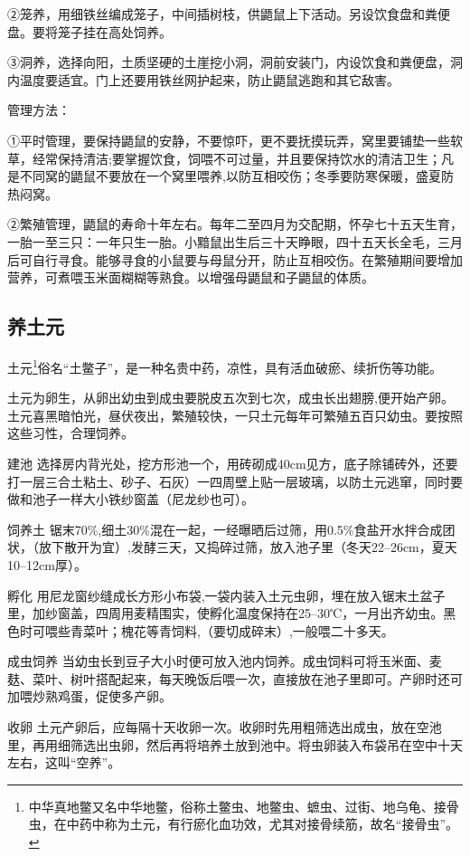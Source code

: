\documentclass{ctexbook}
\begin{document}
②笼养，用细铁丝编成笼子，中间插树枝，供鼯鼠上下活动。另设饮食盘和粪便盘。要将笼子挂在高处饲养。

③洞养，选择向阳，土质坚硬的土崖挖小洞，洞前安装门，内设饮食和粪便盘，洞内温度要适宜。门上还要用铁丝网护起来，防止鼯鼠逃跑和其它敌害。

管理方法：

①平时管理，要保持鼯鼠的安静，不要惊吓，更不要抚摸玩弄，窝里要铺垫一些软草，经常保持清洁;要掌握饮食，饲喂不可过量，并且要保持饮水的清洁卫生；凡是不同窝的鼯鼠不要放在一个窝里喂养,以防互相咬伤；冬季要防寒保暖，盛夏防热闷窝。

②繁殖管理，鼯鼠的寿命十年左右。每年二至四月为交配期，怀孕七十五天生育，一胎一至三只：一年只生一胎。小黯鼠出生后三十天睁眼，四十五天长全毛，三月后可自行寻食。能够寻食的小鼠要与母鼠分开，防止互相咬伤。在繁殖期间要增加营养，可煮喂玉米面糊糊等熟食。以增强母鼯鼠和子鼯鼠的体质。

\subsection{养土元}
土元\footnote{中华真地鳖又名中华地鳖，俗称土鳖虫、地鳖虫、蟅虫、过街、地乌龟、接骨虫，在中药中称为土元，有行瘀化血功效，尤其对接骨续筋，故名“接骨虫”。}俗名“土鳖子”，是一种名贵中药，凉性，具有活血破瘀、续折伤等功能。

土元为卵生，从卵出幼虫到成虫要脱皮五次到七次，成虫长出翅膀,便开始产卵。土元喜黑暗怕光，昼伏夜出，繁殖较快，一只土元每年可繁殖五百只幼虫。要按照这些习性，合理饲养。

建池 选择房内背光处，挖方形池一个，用砖砌成40cm见方，底子除铺砖外，还要打一层三合土粘土、砂子、石灰）一四周壁上贴一层玻璃，以防土元逃窜，同时要做和池子一样大小铁纱窗盖（尼龙纱也可）。

饲养土 锯末70\%,细土30\%混在一起，一经曝晒后过筛，用0.5\%食盐开水拌合成团状，（放下散开为宜）,发酵三天，又捣碎过筛，放入池子里（冬天22--26cm，夏天10--12cm厚）。

孵化 用尼龙窗纱缝成长方形小布袋,一袋内装入土元虫卵，埋在放入锯末土盆子里，加纱窗盖，四周用麦精围实，使孵化温度保持在25--30℃，一月出齐幼虫。黑色时可喂些青菜叶；槐花等青饲料,（要切成碎末）,一般喂二十多天。

成虫饲养 当幼虫长到豆子大小时便可放入池内饲养。成虫饲料可将玉米面、麦麸、菜叶、树叶搭配起来，每天晚饭后喂一次，直接放在池子里即可。产卵时还可加喂炒熟鸡蛋，促使多产卵。

收卵 土元产卵后，应每隔十天收卵一次。收卵时先用粗筛选出成虫，放在空池里，再用细筛选出虫卵，然后再将培养土放到池中。将虫卵装入布袋吊在空中十天左右，这叫“空养”。
\end{document}
